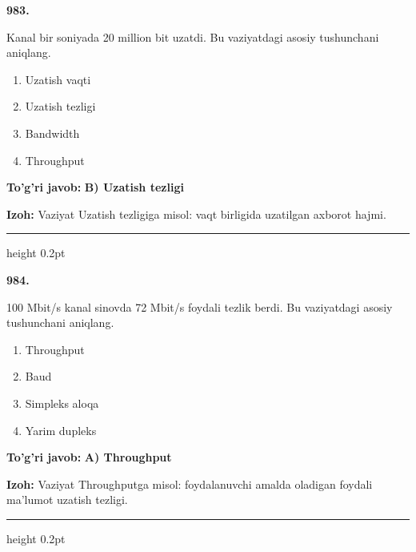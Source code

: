 \documentclass[10pt,a4paper,oneside]{article}
\begin{document}
\noindent\textbf{\color{ink}983.}
\par
Kanal bir soniyada 20 million bit uzatdi. Bu vaziyatdagi asosiy tushunchani aniqlang.
\begin{enumerate}[label=\Alph*),leftmargin=9mm]
\item Uzatish vaqti
\item Uzatish tezligi
\item Bandwidth
\item Throughput
\end{enumerate}
\begin{tcolorbox}[enhanced,breakable,colback=teal!4,colframe=teal!50!black,boxrule=0.5pt,arc=1.1mm,left=3mm,right=3mm,top=1.7mm,bottom=1.7mm,before skip=2mm,after skip=2mm]
\textbf{\color{teal}To'g'ri javob:} \textbf{B) Uzatish tezligi}
\par\smallskip
\textbf{Izoh:} Vaziyat Uzatish tezligiga misol: vaqt birligida uzatilgan axborot hajmi.
\end{tcolorbox}
\vspace{2mm}\hrule height 0.2pt \vspace{3mm}

\noindent\textbf{\color{ink}984.}
\par
100 Mbit/s kanal sinovda 72 Mbit/s foydali tezlik berdi. Bu vaziyatdagi asosiy tushunchani aniqlang.
\begin{enumerate}[label=\Alph*),leftmargin=9mm]
\item Throughput
\item Baud
\item Simpleks aloqa
\item Yarim dupleks
\end{enumerate}
\begin{tcolorbox}[enhanced,breakable,colback=teal!4,colframe=teal!50!black,boxrule=0.5pt,arc=1.1mm,left=3mm,right=3mm,top=1.7mm,bottom=1.7mm,before skip=2mm,after skip=2mm]
\textbf{\color{teal}To'g'ri javob:} \textbf{A) Throughput}
\par\smallskip
\textbf{Izoh:} Vaziyat Throughputga misol: foydalanuvchi amalda oladigan foydali ma'lumot uzatish tezligi.
\end{tcolorbox}
\vspace{2mm}\hrule height 0.2pt \vspace{3mm}
\end{document}
